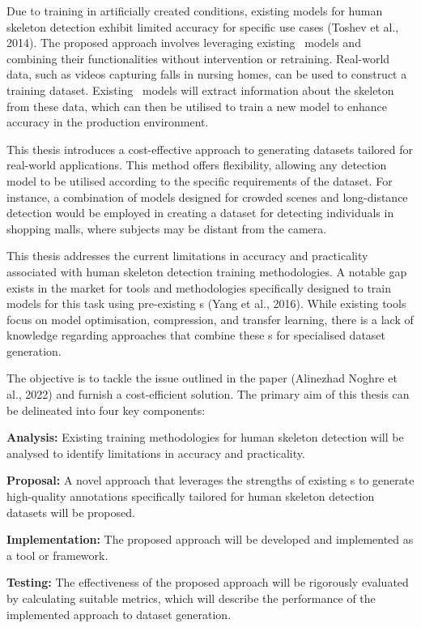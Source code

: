 Due to training in artificially created conditions, existing models for human skeleton detection exhibit limited accuracy for specific use cases (\scc Toshev et al., 2014). The proposed approach involves leveraging existing \NN\ models and combining their functionalities without intervention or retraining. Real-world data, such as videos capturing falls in nursing homes, can be used to construct a training dataset. Existing \NN\ models will extract information about the skeleton from these data, which can then be utilised to train a new model to enhance accuracy in the production environment.

This thesis introduces a cost-effective approach to generating datasets tai\-lored for real-world applications. This method offers flexibility, allowing any detection model to be utilised according to the specific requirements of the dataset. For instance, a combination of models designed for crowded scenes and long-distance detection would be employed in creating a dataset for detecting individuals in shopping malls, where subjects may be distant from the camera.

This thesis addresses the current limitations in accuracy and practicality associated with human skeleton detection training methodologies. A notable gap exists in the market for tools and methodologies specifically designed to train models for this task using pre-existing \NN\-s (\scc Yang et al., 2016). While existing tools focus on model optimisation, compression, and transfer learning, there is a lack of knowledge regarding approaches that combine these \NN\-s for specialised dataset generation.

The objective is to tackle the issue outlined in the paper (\scc Alinezhad Noghre et al., 2022) and furnish a cost-efficient solution. The primary aim of this thesis can be delineated into four key components:

\startitemize[n]
 \item {\bf Analysis:} Existing training methodologies for human skeleton detection will be analysed to identify limitations in accuracy and practicality.
 \item {\bf Proposal:} A novel approach that leverages the strengths of existing \NN\-s to generate high-quality annotations specifically tailored for human skeleton detection datasets will be proposed.
 \item {\bf Implementation:} The proposed approach will be developed and implemented as a tool or framework.
 \item {\bf Testing:} The effectiveness of the proposed approach will be rigorously evaluated by calculating suitable metrics, which will describe the performance of the implemented approach to dataset generation.
\stopitemize